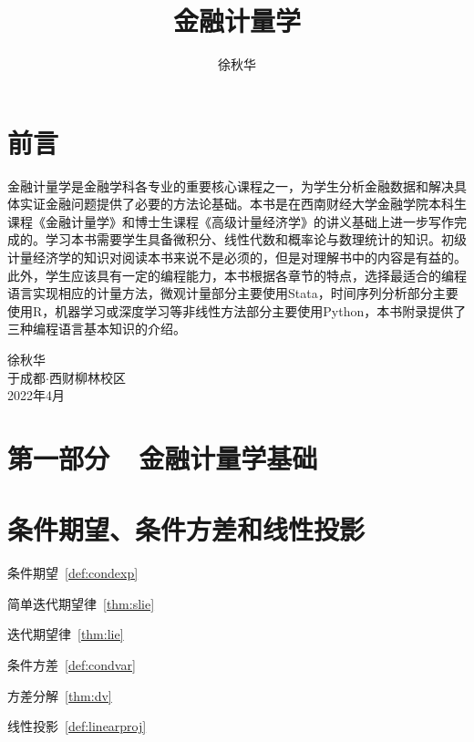 \documentclass[cn,11pt,chinese]{elegantbook}
\title{金融计量学}
\author{徐秋华}
\institute{西南财经大学金融学院}
\date{}
\begin{document}
\maketitle
\frontmatter
\newcommand\specialsectioning{\setcounter{secnumdepth}{-2}}

\chapter*{前言}

金融计量学是金融学科各专业的重要核心课程之一，为学生分析金融数据和解决具体实证金融问题提供了必要的方法论基础。本书是在西南财经大学金融学院本科生课程《金融计量学》和博士生课程《高级计量经济学》的讲义基础上进一步写作完成的。学习本书需要学生具备微积分、线性代数和概率论与数理统计的知识。初级计量经济学的知识对阅读本书来说不是必须的，但是对理解书中的内容是有益的。此外，学生应该具有一定的编程能力，本书根据各章节的特点，选择最适合的编程语言实现相应的计量方法，微观计量部分主要使用Stata，时间序列分析部分主要使用R，机器学习或深度学习等非线性方法部分主要使用Python，本书附录提供了三种编程语言基本知识的介绍。





\vskip 1.5cm

\begin{flushright}
徐秋华\\
于成都$\cdot$西财柳林校区\\
2022年4月
\end{flushright}

\tableofcontents

\mainmatter

\specialsectioning
\chapter{第一部分~~金融计量学基础}
\setcounter{secnumdepth}{1}
\chapter{条件期望、条件方差和线性投影}
\begin{introduction}
  \item 条件期望~\ref{def:condexp}
  \item 简单迭代期望律~\ref{thm:slie}
  \item 迭代期望律~\ref{thm:lie}
  \item 条件方差~\ref{def:condvar}
  \item 方差分解~\ref{thm:dv}
  \item 线性投影~\ref{def:linearproj}
\end{introduction}
\bigskip
\end{document}
